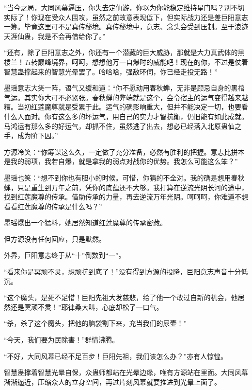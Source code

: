 \begin{this_body}
“当今之局，大同风幕逼压，你失去定仙游，你以为你能稳定维持星门吗？别不切实际了！你现在受众人围攻，虽然之前故意表现低下，但实际战力还是差巨阳意志一筹。毕竟这里可不是真传秘境。真传秘境中，意志、念头会受到压制。至于浪迹天涯仙蛊，我是不会再借给你了。”

“还有，除了巨阳意志之外，你还有一个潜藏的巨大威胁，那就是大力真武体的黑楼兰！五转巅峰境界，呵呵，想想他万一自爆时的威能吧！现在的你，不过是仗着智慧蛊撑起来的智慧光晕罢了。哈哈哈，强敌环伺，你已经走投无路！”

墨瑶意志大笑一阵，语气又缓和道：“你不愿动用春秋蝉，无非是顾忌自身的黑棺气运。其实你大可不必紧张。春秋蝉的弊端就是这个，会令宿主的运气变得越来越糟。当初红莲魔尊就是受累于此。运气的确影响重大，但并不能决定一切，也要看什么人面对。你有这么多的坏运气，用自己的实力才智抗衡，仍旧能有如此成就。马鸿运有那么多的好运气，却抓不住，虽然逃了出去，想必已经落入北原蛊仙之手，成为阶下囚。”

方源冷笑：“你筹谋这么久，一定做了充分准备，必然有胜利的把握。意志比拼本是我的弱项，我若自爆，就是拿我的弱点对战你的优势。我怎么可能这么笨？”

墨瑶也笑：“想不到你也有胆小的时候。可惜，你猜的不全对。我的确是想用春秋蝉，只是重生到万年之前，凭你的底蕴还不大够。我打算在逆流光阴长河的途中，找到红莲魔尊的传承。借助传承的力量，再去逆流万年光阴。呵呵呵，你难道不想看看红莲魔尊的传承是什么吗？”

墨瑶爆出一个猛料，她居然知道红莲魔尊的传承密藏。

但方源没有任何回应，只是默然。

外界，巨阳意志终于从“十”倒数到“一”。

“看来你是冥顽不灵，想顽抗到底了！”没有得到方源的投降，巨阳意志声音十分低沉。

“这个魔头，是死不足惜！巨阳先祖大发慈悲，给了他一个改过自新的机会，他居然还是冥顽不灵！”耶律桑大叫，心底却松了一口气。

“杀，杀了这个魔头，把他的脑袋割下来，充当我们的尿壶！”

“今天，我们要为民除害！”群情沸腾。

“不好，大同风幕已经不足百步！巨阳先祖，我们该怎么办？”亦有人惊惶。

智慧蛊撑着智慧光晕自保，众蛊师都站在光晕边缘，唯有方源站在里面。大同风幕渐渐逼近，压缩众人的立身空间，再过片刻风幕就要推进到光晕上面了。

\end{this_body}

